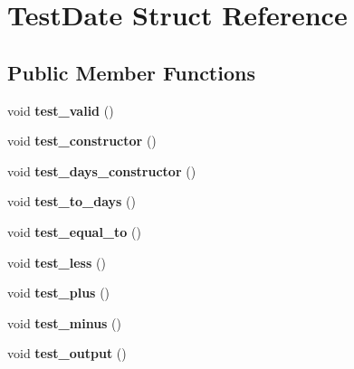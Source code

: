 \hypertarget{structTestDate}{
\section{TestDate Struct Reference}
\label{structTestDate}
}
\subsection*{Public Member Functions}
\begin{DoxyCompactItemize}
\item 
\hypertarget{structTestDate_a99dfc06eab4ebe55c3c05e9c2795f73b}{
void {\bfseries test\_\-valid} ()}
\label{structTestDate_a99dfc06eab4ebe55c3c05e9c2795f73b}

\item 
\hypertarget{structTestDate_aba757487b18b74f2d0f6d65dabc465ae}{
void {\bfseries test\_\-constructor} ()}
\label{structTestDate_aba757487b18b74f2d0f6d65dabc465ae}

\item 
\hypertarget{structTestDate_a518eb07ddd8699a93f95849af8107534}{
void {\bfseries test\_\-days\_\-constructor} ()}
\label{structTestDate_a518eb07ddd8699a93f95849af8107534}

\item 
\hypertarget{structTestDate_a08564e40faf52b37ae2776a0105b3516}{
void {\bfseries test\_\-to\_\-days} ()}
\label{structTestDate_a08564e40faf52b37ae2776a0105b3516}

\item 
\hypertarget{structTestDate_a635f438c76e9dcfca2f544701b17319b}{
void {\bfseries test\_\-equal\_\-to} ()}
\label{structTestDate_a635f438c76e9dcfca2f544701b17319b}

\item 
\hypertarget{structTestDate_af18bb0ad5c84374cd5b451de36aef43a}{
void {\bfseries test\_\-less} ()}
\label{structTestDate_af18bb0ad5c84374cd5b451de36aef43a}

\item 
\hypertarget{structTestDate_a46d6c7cba335d581c685b3c9a656baf2}{
void {\bfseries test\_\-plus} ()}
\label{structTestDate_a46d6c7cba335d581c685b3c9a656baf2}

\item 
\hypertarget{structTestDate_ad2822df4e85d8702626cad906e776ddb}{
void {\bfseries test\_\-minus} ()}
\label{structTestDate_ad2822df4e85d8702626cad906e776ddb}

\item 
\hypertarget{structTestDate_a9e53bb1b43b2cfa1e79b698138aaacdc}{
void {\bfseries test\_\-output} ()}
\label{structTestDate_a9e53bb1b43b2cfa1e79b698138aaacdc}


\end{DoxyCompactItemize}
